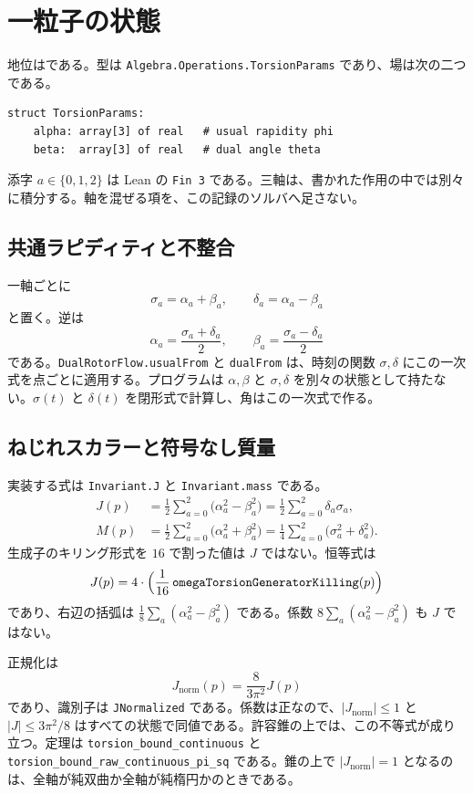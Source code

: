 \section{一粒子の状態}
\label{sec:state}

地位は\dstrec{}である。型は \texttt{Algebra.Operations.TorsionParams} であり、場は次の二つである。

\begin{verbatim}
struct TorsionParams:
    alpha: array[3] of real   # usual rapidity phi
    beta:  array[3] of real   # dual angle theta
\end{verbatim}

添字 \(a\in\{0,1,2\}\) は Lean の \texttt{Fin 3} である。三軸は、書かれた作用の中では別々に積分する。軸を混ぜる項を、この記録のソルバへ足さない。

\subsection{共通ラピディティと不整合}

一軸ごとに
\[
\sigma_a=\alpha_a+\beta_a,\qquad
\delta_a=\alpha_a-\beta_a
\]
と置く。逆は
\[
\alpha_a=\frac{\sigma_a+\delta_a}{2},\qquad
\beta_a=\frac{\sigma_a-\delta_a}{2}
\]
である。\texttt{DualRotorFlow.usualFrom} と \texttt{dualFrom} は、時刻の関数 \(\sigma,\delta\) にこの一次式を点ごとに適用する。プログラムは \(\alpha,\beta\) と \(\sigma,\delta\) を別々の状態として持たない。\(\sigma(t)\) と \(\delta(t)\) を閉形式で計算し、角はこの一次式で作る。

\subsection{ねじれスカラーと符号なし質量}

実装する式は \texttt{Invariant.J} と \texttt{Invariant.mass} である。
\begin{align}
J(p)&=\frac12\sum_{a=0}^{2}\bigl(\alpha_a^2-\beta_a^2\bigr)
=\frac12\sum_{a=0}^{2}\delta_a\sigma_a,\\
M(p)&=\frac12\sum_{a=0}^{2}\bigl(\alpha_a^2+\beta_a^2\bigr)
=\frac14\sum_{a=0}^{2}\bigl(\sigma_a^2+\delta_a^2\bigr).
\end{align}
生成子のキリング形式を \(16\) で割った値は \(J\) ではない。恒等式は
\[
J(p)=4\cdot\Bigl(\frac1{16}\,\texttt{omegaTorsionGeneratorKilling}(p)\Bigr)
\]
であり、右辺の括弧は \(\frac18\sum_a(\alpha_a^2-\beta_a^2)\) である。係数 \(8\sum_a(\alpha_a^2-\beta_a^2)\) も \(J\) ではない。

正規化は
\[
J_{\mathrm{norm}}(p)=\frac{8}{3\pi^2}J(p)
\]
であり、識別子は \texttt{JNormalized} である。係数は正なので、\(|J_{\mathrm{norm}}|\le 1\) と \(|J|\le 3\pi^2/8\) はすべての状態で同値である。許容錐の上では、この不等式が成り立つ。定理は \texttt{torsion\_bound\_continuous} と \texttt{torsion\_bound\_raw\_continuous\_pi\_sq} である。錐の上で \(|J_{\mathrm{norm}}|=1\) となるのは、全軸が純双曲か全軸が純楕円かのときである。

